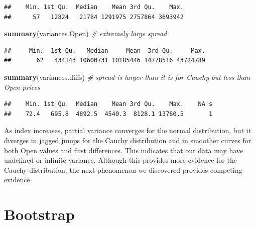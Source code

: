 \documentclass[]{article}
\newenvironment{Shaded}{\begin{snugshade}}{\end{snugshade}}
\newcommand{\CommentTok}[1]{\textcolor[rgb]{0.56,0.35,0.01}{\textit{#1}}}
\newcommand{\KeywordTok}[1]{\textcolor[rgb]{0.13,0.29,0.53}{\textbf{#1}}}
\newcommand{\NormalTok}[1]{#1}
\begin{document}
\begin{verbatim}
##    Min. 1st Qu.  Median    Mean 3rd Qu.    Max. 
##      57   12824   21784 1291975 2757864 3693942
\end{verbatim}

\begin{Shaded}
\begin{Highlighting}[]
\KeywordTok{summary}\NormalTok{(variances.Open) }\CommentTok{# extremely large spread}
\end{Highlighting}
\end{Shaded}

\begin{verbatim}
##     Min.  1st Qu.   Median     Mean  3rd Qu.     Max. 
##       62   434143 10600731 10185446 14778516 43724789
\end{verbatim}

\begin{Shaded}
\begin{Highlighting}[]
\KeywordTok{summary}\NormalTok{(variances.diffs) }\CommentTok{# spread is larger than it is for Cauchy but less than Open prices}
\end{Highlighting}
\end{Shaded}

\begin{verbatim}
##    Min. 1st Qu.  Median    Mean 3rd Qu.    Max.    NA's 
##    72.4   695.8  4892.5  4540.3  8128.1 13760.5       1
\end{verbatim}

As index increases, partial variance converges for the normal
distribution, but it diverges in jagged jumps for the Cauchy
distribution and in smoother curves for both Open values and first
differences. This indicates that our data may have undefined or infinite
variance. Although this provides more evidence for the Cauchy
distribution, the next phenomenon we discovered provides competing
evidence.

\hypertarget{bootstrap}{%
\section{Bootstrap}\label{bootstrap}}
\end{document}
